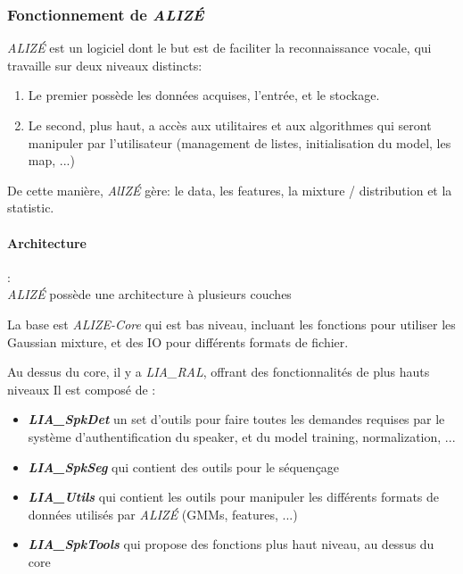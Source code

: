 \subsubsection*{Fonctionnement de \textit{ALIZÉ}}
\textit{ALIZÉ} est un logiciel dont le but est de faciliter la reconnaissance vocale, qui travaille sur deux niveaux distincts:
\begin{enumerate}
    \item Le premier possède les données acquises, l'entrée, et le stockage.
    \item Le second, plus haut, a accès aux utilitaires et aux algorithmes qui seront manipuler par l'utilisateur (management de listes, initialisation du model, les map, ...)
\end{enumerate}

De cette manière, \textit{AlIZÉ} gère: le data, les features,  la mixture / distribution et la statistic.

\paragraph*{Architecture} :\\

\textit{ALIZÉ} possède une architecture à plusieurs couches

La base est \textit{ALIZE-Core} qui est bas niveau, incluant les fonctions pour utiliser les Gaussian mixture, et des IO pour différents formats de fichier.

Au dessus du core, il y a \textit{LIA\_RAL}, offrant des fonctionnalités de plus hauts niveaux
Il est composé de :
\begin{itemize}
    \item \textbf{\textit{LIA\_SpkDet}}  un set d'outils pour faire toutes les demandes requises par le système d'authentification du speaker, et du model training, normalization, ...
    \item \textbf{\textit{LIA\_SpkSeg}}  qui contient des outils pour le séquençage
    \item \textbf{\textit{LIA\_Utils}}  qui contient les outils pour manipuler les différents formats de données utilisés par \textit{ALIZÉ} (GMMs, features, ...)
    \item \textbf{\textit{LIA\_SpkTools}}  qui propose des fonctions plus haut niveau, au dessus du core

\end{itemize}


